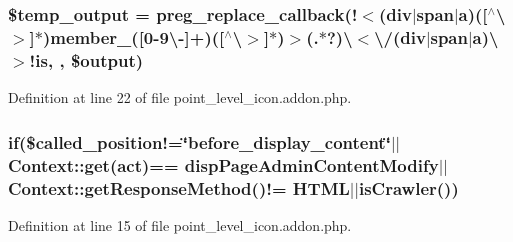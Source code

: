 \subsubsection[{\$temp\+\_\+output}]{\setlength{\rightskip}{0pt plus 5cm}\$temp\+\_\+output = preg\+\_\+replace\+\_\+callback(\textquotesingle{}!$<$(div$\vert$span$\vert$a)(\mbox{[}$^\wedge$\textbackslash{}$>$\mbox{]}$\ast$)member\+\_\+(\mbox{[}0-\/9\textbackslash{}-\/\mbox{]}+)(\mbox{[}$^\wedge$\textbackslash{}$>$\mbox{]}$\ast$)$>$(.$\ast$?)\textbackslash{}$<$\textbackslash{}/(div$\vert$span$\vert$a)\textbackslash{}$>$!is\textquotesingle{}, \textquotesingle{}, \$output)}\label{point__level__icon_8addon_8php_a5866ef6f77cbeaf87d8208cf805bbc3d}


Definition at line 22 of file point\+\_\+level\+\_\+icon.\+addon.\+php.

\hypertarget{point__level__icon_8addon_8php_a29031816e50a8f742422e671b2bef9b2}{}
\subsubsection[{if}]{\setlength{\rightskip}{0pt plus 5cm}if(\$called\+\_\+position!=\char`\"{}before\+\_\+display\+\_\+content\char`\"{}$\vert$$\vert$Context\+::get(\textquotesingle{}act\textquotesingle{})== \textquotesingle{}disp\+Page\+Admin\+Content\+Modify\textquotesingle{}$\vert$$\vert${\bf Context\+::get\+Response\+Method}()!= \textquotesingle{}H\+T\+M\+L\textquotesingle{}$\vert$$\vert${\bf is\+Crawler}())}\label{point__level__icon_8addon_8php_a29031816e50a8f742422e671b2bef9b2}


Definition at line 15 of file point\+\_\+level\+\_\+icon.\+addon.\+php.

